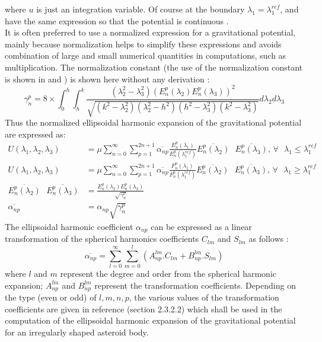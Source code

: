%
where $u$ is just an integration variable. Of course at the boundary $\lambda_1 = \lambda_1^{ref}$,  and  have the same expression so that the potential is continuous \cite{ellipse_colorado}.
\\
It is often preferred to use a normalized expression for a gravitational potential, mainly because normalization helps to simplify these expressions and avoids combination of large and small numerical quantities in computations, such as multiplication. The normalization constant (the use of the normalization constant is shown in  and ) is shown here without any derivation \cite{ellipse_colorado}:
\begin{equation}
\label{ellipse_norm}
\gamma_n^p = 8 \times \int_{0}^{h} \int_h^k \frac{(\lambda_2^2 - \lambda_3^2)(E_n^p(\lambda_2)E_n^p(\lambda_3))^2}{\sqrt{(k^2-\lambda_2^2)(\lambda_2^2-h^2)(h^2-\lambda_3^2)(k^2-\lambda_3^2)}}d\lambda_2d\lambda_3
\end{equation}
%
Thus the normalized ellipsoidal harmonic expansion of the gravitational potential are expressed as:
\begin{align}
\label{ellipse_norm_in}
U(\lambda_1, \lambda_2, \lambda_3) &= \mu \sum_{n=0}^{\infty} \sum_{p=1}^{2n+1} \overline{\alpha_{np}} \frac{E_n^p(\lambda_1)}{E_n^p(\lambda_1^{ref})} \overline{E_n^p(\lambda_2)} \text{ } \overline{E_n^p(\lambda_3)}  \text{,    } \forall \text{ }\lambda_1 \leq \lambda_1^{ref} \\
\label{ellipse_norm_out}
U(\lambda_1, \lambda_2, \lambda_3) &= \mu \sum_{n=0}^{\infty} \sum_{p=1}^{2n+1} \overline{\alpha_{np}} \frac{F_n^p(\lambda_1)}{F_n^p(\lambda_1^{ref})} \overline{E_n^p(\lambda_2)} \text{ } \overline{E_n^p(\lambda_3)} \text{,    } \forall \text{ }\lambda_1 \geq \lambda_1^{ref} \\
\label{bar1}
\overline{E_n^p(\lambda_2)} \text{ } \overline{E_n^p(\lambda_3)} &= \frac{E_n^p(\lambda_2) E_n^p(\lambda_3)}{\sqrt{\gamma_n^p}}\\
\label{bar2}
\overline{\alpha_{np}} &= \alpha_{np} \sqrt{\gamma_n^p}
\end{align}
%
The ellipsoidal harmonic coefficient $\alpha_{np}$ can be expressed as a linear transformation of the spherical harmonics coefficients $C_{lm}$ and $S_{lm}$ as follows \cite{ellipse_colorado}:
\begin{equation}
\label{alpha_coeff}
\overline{\alpha_{np}} = \sum_{l=0}^{\infty} \sum_{m=0}^{l} (A_{np}^{lm}.C_{lm} + B_{np}^{lm}.S_{lm})
\end{equation}
%
where $l$ and $m$ represent the degree and order from the spherical harmonic expansion; $A_{np}^{lm}$ and $B_{np}^{lm}$ represent the transformation coefficients. Depending on the type (even or odd) of $l,m,n,p$, the various values of the transformation coefficients are given in reference \cite{ellipse_colorado} (section 2.3.2.2) which shall be used in the computation of the ellipsoidal harmonic expansion of the gravitational potential for an irregularly shaped asteroid body.

